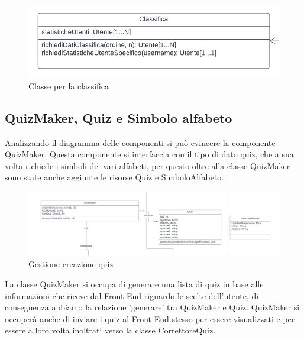 \begin{figure}[!h]
\centering
\includegraphics[scale=0.35]{images/classe_classifica.png}
\caption{Classe per la classifica}
\label{fig:classe_classifica}
\end{figure}
\noindent

\subsection{QuizMaker, Quiz e Simbolo alfabeto}
Analizzando il diagramma delle componenti si può evincere la componente QuizMaker. Questa componente si interfaccia con il tipo di dato quiz, che a sua volta richiede i simboli dei vari alfabeti, per questo oltre alla classe QuizMaker sono state anche aggiunte le risorse Quiz e SimboloAlfabeto. 

\begin{figure}[!h]
\centering
\includegraphics[scale=0.10]{images/classe_quiz_quizmaker.png}
\caption{Gestione creazione quiz}
\label{fig:classe_quizmaker}
\end{figure}
\noindent
La classe QuizMaker si occupa di generare una lista di quiz in base alle informazioni che riceve dal Front-End riguardo le scelte dell'utente, di conseguenza abbiamo la relazione 'generare' tra QuizMaker e Quiz. QuizMaker si occuperà anche di inviare i quiz al Front-End stesso per essere visualizzati e per essere a loro volta inoltrati verso la classe CorrettoreQuiz.


